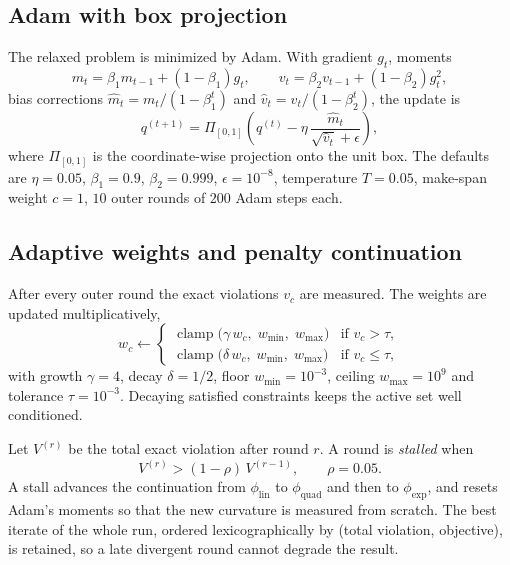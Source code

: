 \documentclass[11pt,a4paper]{article}
\newcommand{\clamp}{\operatorname{clamp}}
\begin{document}
\subsection{Adam with box projection}
The relaxed problem is minimized by Adam. With gradient $g_t$, moments
\begin{equation}
m_t=\beta_1m_{t-1}+(1-\beta_1)g_t,
\qquad
v_t=\beta_2v_{t-1}+(1-\beta_2)g_t^2,
\end{equation}
bias corrections $\hat m_t=m_t/(1-\beta_1^t)$ and
$\hat v_t=v_t/(1-\beta_2^t)$, the update is
\begin{equation}
q^{(t+1)}=\Pi_{[0,1]}\!\left(q^{(t)}
-\eta\,\frac{\hat m_t}{\sqrt{\hat v_t}+\epsilon}\right),
\label{eq:adam}
\end{equation}
where $\Pi_{[0,1]}$ is the coordinate-wise projection onto the unit box. The
defaults are $\eta=0.05$, $\beta_1=0.9$, $\beta_2=0.999$, $\epsilon=10^{-8}$,
temperature $T=0.05$, make-span weight $c=1$, $10$ outer rounds of $200$ Adam
steps each.

\subsection{Adaptive weights and penalty continuation}
After every outer round the exact violations $v_c$ are measured. The weights
are updated multiplicatively,
\begin{equation}
w_c\leftarrow
\begin{cases}
\clamp\bigl(\gamma\,w_c,\;w_{\min},\;w_{\max}\bigr)
& \text{if } v_c>\tau,\\[2pt]
\clamp\bigl(\delta\,w_c,\;w_{\min},\;w_{\max}\bigr)
& \text{if } v_c\le\tau,
\end{cases}
\label{eq:weights}
\end{equation}
with growth $\gamma=4$, decay $\delta=1/2$, floor $w_{\min}=10^{-3}$, ceiling
$w_{\max}=10^{9}$ and tolerance $\tau=10^{-3}$. Decaying satisfied
constraints keeps the active set well conditioned.

Let $V^{(r)}$ be the total exact violation after round $r$. A round is
\emph{stalled} when
\begin{equation}
V^{(r)}>(1-\rho)\,V^{(r-1)},
\qquad \rho=0.05.
\end{equation}
A stall advances the continuation from $\phi_{\mathrm{lin}}$ to
$\phi_{\mathrm{quad}}$ and then to $\phi_{\mathrm{exp}}$, and resets Adam's
moments so that the new curvature is measured from scratch. The best iterate
of the whole run, ordered lexicographically by (total violation, objective),
is retained, so a late divergent round cannot degrade the result.
\end{document}
